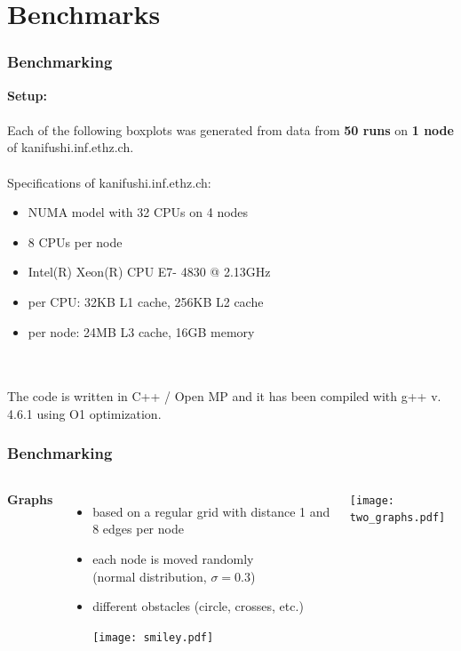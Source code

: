 \documentclass{beamer}
\begin{document}
\section{Benchmarks}

\begin{frame}
\frametitle{Benchmarking}
\textbf{Setup:}\\ \quad\\
Each of the following boxplots was generated from data from \textbf{50 runs} on \textbf{1 node} of kanifushi.inf.ethz.ch.\\
\quad\\
Specifications of kanifushi.inf.ethz.ch:
\begin{itemize}
\item NUMA model with 32 CPUs on 4 nodes
\item 8 CPUs per node
\item Intel(R) Xeon(R) CPU E7- 4830  @ 2.13GHz
\item per CPU: 32KB L1 cache, 256KB L2 cache
\item per node: 24MB L3 cache, 16GB memory
\end{itemize}
\quad\\ \quad\\
The code is written in C++ / Open MP and it has been compiled with g++ v. 4.6.1 using O1 optimization.
\end{frame}

\begin{frame}
\frametitle{Benchmarking}
\begin{columns}[c] %
\textbf{Graphs}
\begin{itemize}
\item based on a regular grid with distance 1 and 8 edges per node
\item each node  is moved randomly\\(normal distribution, $\sigma = 0.3$)
\item different obstacles (circle, crosses, etc.)
\vspace{10pt}
\begin{center}
	\texttt{[image: smiley.pdf]}
\end{center}
\end{itemize}

\begin{center}
	\texttt{[image: two\_graphs.pdf]}
\end{center}
\end{columns}
\end{frame}
\end{document}
